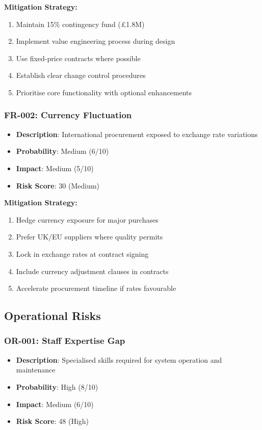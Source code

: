 \textbf{Mitigation Strategy:}
\begin{enumerate}
\item Maintain 15\% contingency fund (£1.8M)
\item Implement value engineering process during design
\item Use fixed-price contracts where possible
\item Establish clear change control procedures
\item Prioritise core functionality with optional enhancements
\end{enumerate}

\subsubsection{FR-002: Currency Fluctuation}
\begin{itemize}
\item \textbf{Description}: International procurement exposed to exchange rate variations
\item \textbf{Probability}: Medium (6/10)
\item \textbf{Impact}: Medium (5/10)
\item \textbf{Risk Score}: 30 (Medium)
\end{itemize}

\textbf{Mitigation Strategy:}
\begin{enumerate}
\item Hedge currency exposure for major purchases
\item Prefer UK/EU suppliers where quality permits
\item Lock in exchange rates at contract signing
\item Include currency adjustment clauses in contracts
\item Accelerate procurement timeline if rates favourable
\end{enumerate}

\subsection{Operational Risks}

\subsubsection{OR-001: Staff Expertise Gap}
\begin{itemize}
\item \textbf{Description}: Specialised skills required for system operation and maintenance
\item \textbf{Probability}: High (8/10)
\item \textbf{Impact}: Medium (6/10)
\item \textbf{Risk Score}: 48 (High)
\end{itemize}

